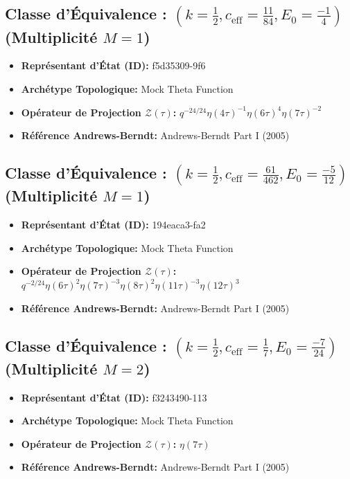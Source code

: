 \documentclass[11pt,twoside,openright]{book}
\begin{document}
\subsection*{Classe d'Équivalence : $(k=\frac{1}{2}, c_{\text{eff}}=\frac{11}{84}, E_0=\frac{-1}{4})$ (Multiplicité $M=1$)}
\begin{itemize}
  \item \textbf{Représentant d'État (ID):} f5d35309-9f6
  \item \textbf{Archétype Topologique:} Mock Theta Function
  \item \textbf{Opérateur de Projection $\mathcal{Z}(\tau)$:} $q^{-24/24} \eta(4\tau)^{-1} \eta(6\tau)^{4} \eta(7\tau)^{-2}$
  \item \textbf{Référence Andrews-Berndt:} Andrews-Berndt Part I (2005)
\end{itemize}

\subsection*{Classe d'Équivalence : $(k=\frac{1}{2}, c_{\text{eff}}=\frac{61}{462}, E_0=\frac{-5}{12})$ (Multiplicité $M=1$)}
\begin{itemize}
  \item \textbf{Représentant d'État (ID):} 194eaca3-fa2
  \item \textbf{Archétype Topologique:} Mock Theta Function
  \item \textbf{Opérateur de Projection $\mathcal{Z}(\tau)$:} $q^{-2/24} \eta(6\tau)^{2} \eta(7\tau)^{-3} \eta(8\tau)^{2} \eta(11\tau)^{-3} \eta(12\tau)^{3}$
  \item \textbf{Référence Andrews-Berndt:} Andrews-Berndt Part I (2005)
\end{itemize}

\subsection*{Classe d'Équivalence : $(k=\frac{1}{2}, c_{\text{eff}}=\frac{1}{7}, E_0=\frac{-7}{24})$ (Multiplicité $M=2$)}
\begin{itemize}
  \item \textbf{Représentant d'État (ID):} f3243490-113
  \item \textbf{Archétype Topologique:} Mock Theta Function
  \item \textbf{Opérateur de Projection $\mathcal{Z}(\tau)$:} $\eta(7\tau)$
  \item \textbf{Référence Andrews-Berndt:} Andrews-Berndt Part I (2005)
\end{itemize}
\end{document}
